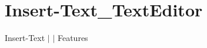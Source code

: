 \chapter{Insert-\/\+Text\+\_\+\+Text\+Editor }
\hypertarget{md__docs_2_text_editor_2_features_2_insert-_text___text_editor}{}\label{md__docs_2_text_editor_2_features_2_insert-_text___text_editor}
Insert-\/\+Text \texorpdfstring{$\vert$}{|}  \texorpdfstring{$\vert$}{|} Features



 
